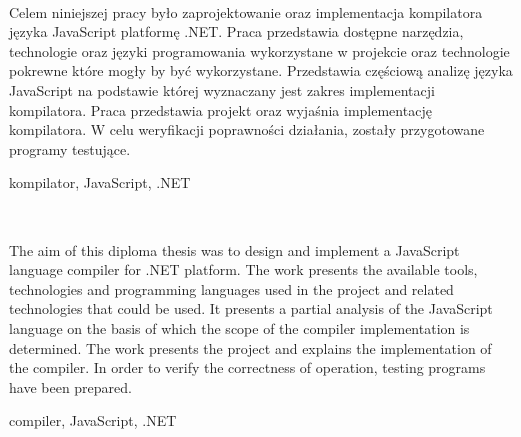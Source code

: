 %


\begin{center}
\\[1cm] 
\end{center}
Celem niniejszej pracy było zaprojektowanie oraz implementacja kompilatora języka JavaScript platformę .NET. Praca przedstawia dostępne narzędzia, technologie oraz języki programowania wykorzystane w projekcie oraz technologie pokrewne które mogły by być wykorzystane. Przedstawia częściową analizę języka JavaScript na podstawie której wyznaczany jest zakres implementacji kompilatora. Praca przedstawia projekt oraz wyjaśnia implementację kompilatora. W celu weryfikacji poprawności działania, zostały przygotowane programy testujące.

\vspace{10pt}
 kompilator, JavaScript, .NET

\vfill

\begin{center}
\\[1cm] 
\end{center}
The aim of this diploma thesis was to design and implement a JavaScript language compiler for .NET platform. The work presents the available tools, technologies and programming languages used in the project and related technologies that could be used. It presents a partial analysis of the JavaScript language on the basis of which the scope of the compiler implementation is determined. The work presents the project and explains the implementation of the compiler. In order to verify the correctness of operation, testing programs have been prepared. 

\vspace{10pt}
 compiler, JavaScript, .NET
